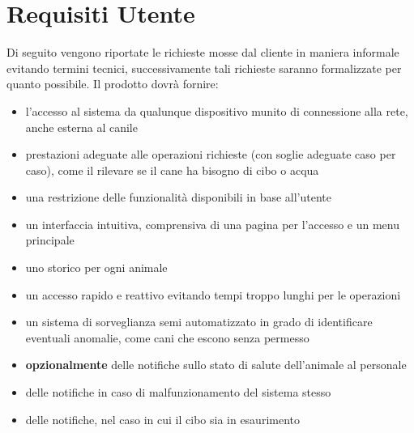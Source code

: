 	\section{Requisiti Utente}
	Di seguito vengono riportate le richieste mosse dal cliente in maniera informale evitando termini tecnici, successivamente tali richieste saranno formalizzate per quanto possibile.
	Il prodotto dovrà fornire: 
		\begin{itemize}
            \item l'accesso al sistema da qualunque dispositivo munito di connessione alla rete, anche esterna al canile
            \item prestazioni adeguate alle operazioni richieste (con soglie adeguate caso per caso), come il rilevare se il cane ha bisogno di cibo o acqua 
            \item una restrizione delle funzionalità disponibili in base all'utente
            \item un interfaccia intuitiva, comprensiva di una pagina per l'accesso e un menu principale
            \item uno storico per ogni animale
            \item un accesso rapido e reattivo evitando tempi troppo lunghi per le operazioni
            \item un sistema di sorveglianza semi automatizzato in grado di identificare eventuali anomalie, come cani che escono senza permesso
            \item \textbf{opzionalmente} delle notifiche sullo stato di salute dell'animale al personale
            \item delle notifiche in caso di malfunzionamento del sistema stesso
            \item delle notifiche, nel caso in cui il cibo sia in esaurimento 
        \end{itemize}
